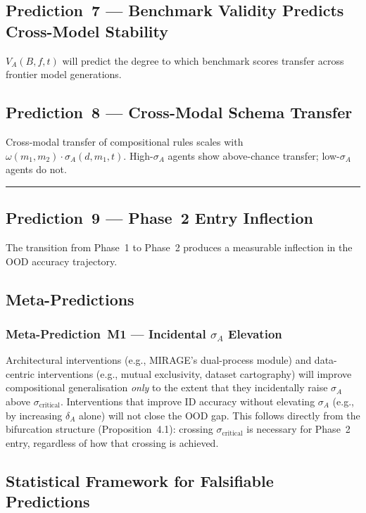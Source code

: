 \subsection{Prediction~7 --- Benchmark Validity Predicts Cross-Model
Stability}
$V_A(B,f,t)$ will predict the degree to which benchmark scores transfer
across frontier model generations.

\subsection{Prediction~8 --- Cross-Modal Schema Transfer}
Cross-modal transfer of compositional rules scales with
$\omega(m_1, m_2) \cdot \sigma_A(d, m_1, t)$. High-$\sigma_A$ agents
show above-chance transfer; low-$\sigma_A$ agents do not.

\noindent\rule{\linewidth}{0.4pt}

\subsection{Prediction~9 --- Phase~2 Entry Inflection}
The transition from Phase~1 to Phase~2 produces a measurable inflection
in the OOD accuracy trajectory.

\subsection*{Meta-Predictions}

\subsubsection*{Meta-Prediction~M1 --- Incidental \texorpdfstring{$\sigma_A$}{sigma\_A} Elevation}\label{sec:meta-M1}
Architectural interventions (e.g., MIRAGE's dual-process module) and
data-centric interventions (e.g., mutual exclusivity, dataset
cartography) will improve compositional generalisation \emph{only}
to the extent that they incidentally raise $\sigma_A$ above
$\sigma_{\text{critical}}$. Interventions that improve ID accuracy
without elevating $\sigma_A$ (e.g., by increasing $\delta_A$ alone)
will not close the OOD gap. This follows directly from the
bifurcation structure (Proposition~4.1): crossing
$\sigma_{\text{critical}}$ is necessary for Phase~2 entry, regardless
of how that crossing is achieved.

\subsection{Statistical Framework for Falsifiable Predictions}\label{sec:statistical-framework}

